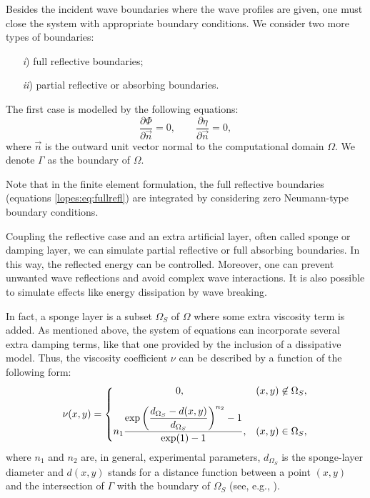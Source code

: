 Besides the incident wave boundaries
 where the wave profiles
are given, one must close the system with appropriate
boundary conditions.
We consider two more types of
boundaries:
\begin{itemize}
\item[{\it i})] full reflective boundaries;
\item[{\it  ii})] partial reflective or absorbing boundaries.
\end{itemize}
The first case is modelled by the following equations:
\begin{equation}\label{lopes:eq:fullrefl}
\frac{\partial \Phi}{\partial \vec{n}}=0,\qquad\frac{\partial \eta}{\partial \vec{n}}=0,
\end{equation}
where \(\vec{n}\) is the outward unit vector normal to the
computational domain \(\Omega\).
We  denote  \(\Gamma\) as  the boundary of \(\Omega\).

Note that  in  the finite element formulation, the full
reflective boundaries (equations \eqref{lopes:eq:fullrefl})  are integrated by
considering zero Neumann-type boundary conditions.

Coupling the  reflective case and an extra artificial
  layer, often called sponge  or damping layer,
we can simulate partial reflective or full absorbing boundaries.
In this way, the  reflected energy
can be controlled. Moreover, one can prevent unwanted wave
  reflections and avoid complex wave interactions.
It is also possible to simulate effects like energy dissipation by wave breaking.

In fact, a sponge layer is a
subset \(\Omega_S\) of \(\Omega\) where
some extra viscosity term is added.
As mentioned above, the system of equations can incorporate
several extra damping terms, like that one provided by the
inclusion of  a dissipative model. Thus, the viscosity
coefficient \(\nu\) can be described  by a
 function of the following form:
\begin{equation}
\nu(x,y)=
\left\{
\begin{matrix}
0,& (x,y)\not\in\Omega_S ,\vspace{0.3cm}\\
\displaystyle
n_1\frac{\displaystyle\exp{\left(\frac{d_{\Omega_S}-d(x,y)}{d_{\Omega_S}}\right)^{n_2}}-1}{\exp(1)-1},&
(x,y) \in\Omega_S,
\end{matrix}
\right.
\end{equation}
where \(n_1\) and  \(n_2\) are, in general, experimental
 parameters, \(d_{\Omega_S}\) is  the sponge-layer diameter and
 \(d(x,y)\)
stands for a distance function between a point \((x,y)\) and
 the intersection of \(\Gamma\) with the boundary
 of \(\Omega_S\) (see, e.g., \cite{Walkley1999}).

